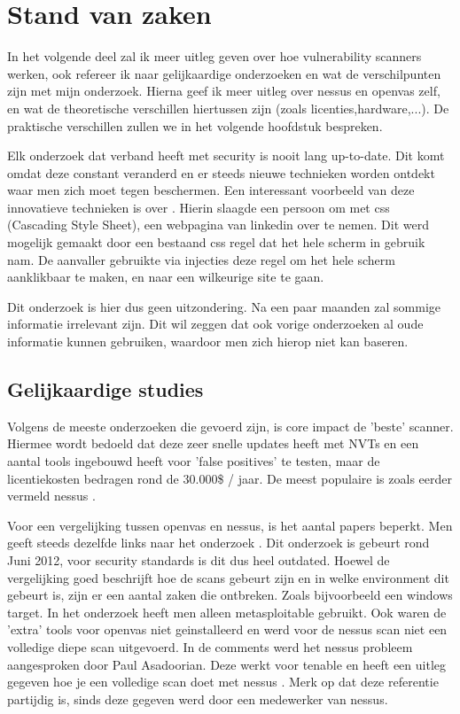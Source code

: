 \section{Stand van zaken}
\label{sec:stand-van-zaken}

In het volgende deel zal ik meer uitleg geven over hoe vulnerability scanners werken, ook refereer ik naar gelijkaardige onderzoeken en wat de verschilpunten zijn met mijn onderzoek. Hierna geef ik meer uitleg over nessus en openvas zelf, en wat de theoretische verschillen hiertussen zijn (zoals licenties,hardware,...).  De praktische verschillen zullen we in het volgende hoofdstuk bespreken.

Elk onderzoek dat verband heeft met security is nooit lang up-to-date. Dit komt omdat deze constant veranderd en er steeds nieuwe technieken worden ontdekt waar men zich moet tegen beschermen. Een interessant voorbeeld van deze innovatieve technieken is over \textcite{Linkedin}. Hierin slaagde een persoon om met css (Cascading Style Sheet), een webpagina van linkedin over te nemen. Dit werd mogelijk gemaakt door een bestaand css regel dat het hele scherm in gebruik nam. De aanvaller gebruikte via injecties deze regel om het hele scherm aanklikbaar te maken, en naar een wilkeurige site te gaan.

Dit onderzoek is hier dus geen uitzondering. Na een paar maanden zal sommige informatie irrelevant zijn. Dit wil zeggen dat ook vorige onderzoeken al oude informatie kunnen gebruiken, waardoor men zich hierop niet kan baseren.

\subsection{Gelijkaardige studies}

Volgens de meeste onderzoeken die gevoerd zijn, is core impact de 'beste' scanner. Hiermee wordt bedoeld dat deze zeer snelle updates heeft met NVTs en een aantal tools ingebouwd heeft voor 'false positives' te testen, maar de licentiekosten bedragen rond de 30.000\$ / jaar. De meest populaire is zoals eerder vermeld nessus \autocite{Concise,Sectools}.

Voor een vergelijking tussen openvas en nessus, is het aantal papers beperkt. Men geeft steeds dezelfde links naar het onderzoek \textcite{Hackertarget}. Dit onderzoek is gebeurt rond Juni 2012, voor security standards is dit dus heel outdated. Hoewel de vergelijking goed beschrijft hoe de scans gebeurt zijn en in welke environment dit gebeurt is, zijn er een aantal zaken die ontbreken. Zoals bijvoorbeeld een windows target. In het onderzoek heeft men alleen metasploitable gebruikt. Ook waren de 'extra' tools voor openvas niet geinstalleerd en werd voor de nessus scan niet een volledige diepe scan uitgevoerd. In de comments werd het nessus probleem aangesproken door Paul Asadoorian. Deze werkt voor tenable en heeft een uitleg gegeven hoe je een volledige scan doet met nessus \textcite{Securityweekly}. Merk op dat deze referentie partijdig is, sinds deze gegeven werd door een medewerker van nessus.


